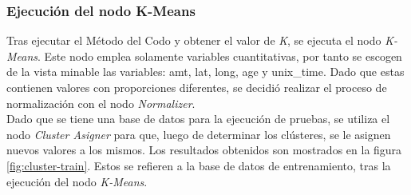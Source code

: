 \subsubsection{Ejecución del nodo K-Means}
Tras ejecutar el Método del Codo y obtener el valor de \emph{K}, se ejecuta el nodo \textit{K-Means}. Este nodo emplea solamente variables cuantitativas, por tanto se escogen de la vista minable las variables: \textsf{amt, lat, long, age y unix\_time}. Dado que estas contienen valores con proporciones diferentes, se decidió realizar el proceso de normalización con el nodo \textit{Normalizer}. \\
Dado que se tiene una base de datos para la ejecución de pruebas, se utiliza el nodo \textit{Cluster Asigner} para que, luego de determinar los clústeres, se le asignen nuevos valores a los mismos. Los resultados obtenidos son mostrados en la figura \ref{fig:cluster-train}. Estos se refieren a la base de datos de entrenamiento, tras la ejecución del nodo \textit{K-Means}.
